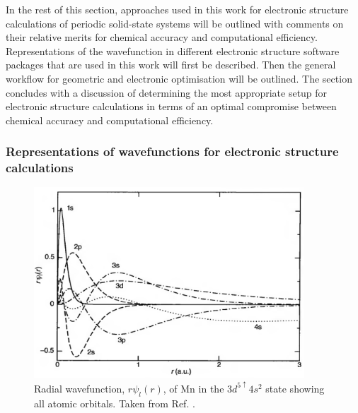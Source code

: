 \documentclass[11pt, twoside]{report}
\begin{document}
In the rest of this section, approaches used in this work for electronic structure calculations of periodic solid-state systems will be outlined with comments on their relative merits for chemical accuracy and computational efficiency. Representations of the wavefunction in different electronic structure software packages that are used in this work will first be described. Then the general workflow for geometric and electronic optimisation will be outlined. The section concludes with a discussion of determining the most appropriate setup for electronic structure calculations in terms of an optimal compromise between chemical accuracy and computational efficiency.



\subsubsection{Representations of wavefunctions for electronic structure calculations}
\begin{figure}[h!]
  \centering
    \includegraphics[width=0.9\textwidth]{figures/atomic_radial_wavefunction.png}
    \caption[Radial wavefunction, $r\psi_l(r)$, of Mn in the $3d^{5\uparrow}4s^2$ state showing all atomic orbitals.]{Radial wavefunction, $r\psi_l(r)$, of Mn in the $3d^{5\uparrow}4s^2$ state showing all atomic orbitals. Taken from Ref. .}
  \label{atomic_radial_wavefunction}
\end{figure}

\end{document}
